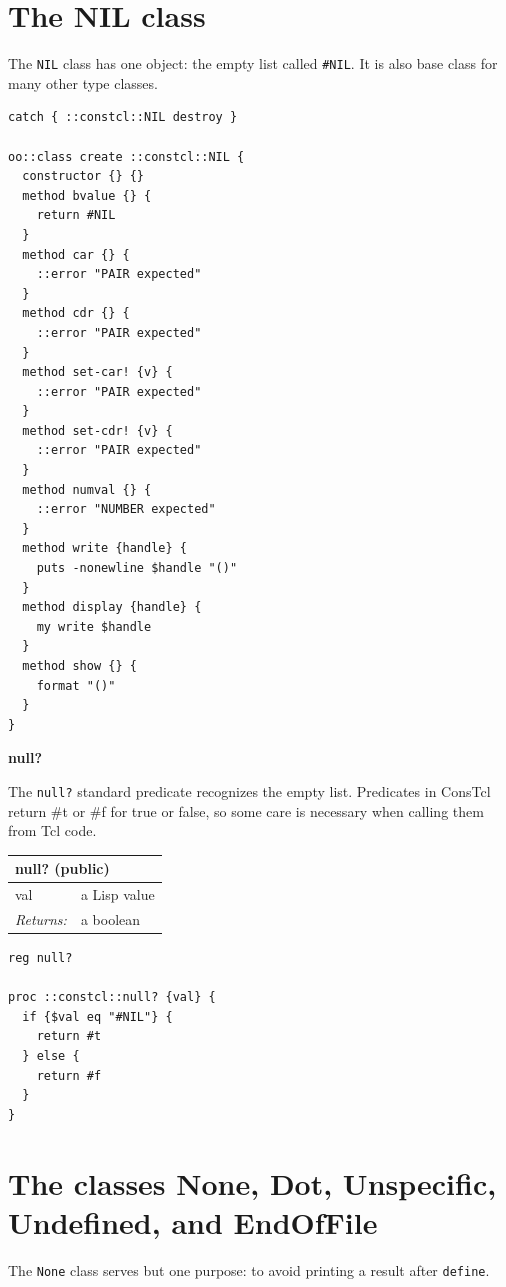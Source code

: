 \documentclass[twoside,9pt]{report}
\begin{document}
\section{The NIL class}
\label{the-nil-class}

The \texttt{NIL} class has one object: the empty list called \texttt{\#NIL}. It is also base class for many other type classes.

\noindent\makebox[\linewidth]{\rule{\linewidth}{0.4pt}}
\begin{lstlisting}
catch { ::constcl::NIL destroy }
 
oo::class create ::constcl::NIL {
  constructor {} {}
  method bvalue {} {
    return #NIL
  }
  method car {} {
    ::error "PAIR expected"
  }
  method cdr {} {
    ::error "PAIR expected"
  }
  method set-car! {v} {
    ::error "PAIR expected"
  }
  method set-cdr! {v} {
    ::error "PAIR expected"
  }
  method numval {} {
    ::error "NUMBER expected"
  }
  method write {handle} {
    puts -nonewline $handle "()"
  }
  method display {handle} {
    my write $handle
  }
  method show {} {
    format "()"
  }
}
\end{lstlisting}
\noindent\makebox[\linewidth]{\rule{\linewidth}{0.4pt}}

\textbf{null?}


The \texttt{null?} standard predicate recognizes the empty list. Predicates in ConsTcl return \#t or \#f for true or false, so some care is necessary when calling them from Tcl code.

\begin{tabular}{ |l l| }
\hline
\multicolumn{2}{|l|}{null? (public)} \\
\hline
val & a Lisp value \\
\textit{Returns:} & a boolean \\
\hline
\end{tabular}

\noindent\makebox[\linewidth]{\rule{\linewidth}{0.4pt}}
\begin{lstlisting}
reg null?
 
proc ::constcl::null? {val} {
  if {$val eq "#NIL"} {
    return #t
  } else {
    return #f
  }
}
\end{lstlisting}
\noindent\makebox[\linewidth]{\rule{\linewidth}{0.4pt}}
\section{The classes None, Dot, Unspecific, Undefined, and EndOfFile}
\label{the-classes-none,-dot,-unspecific,-undefined,-and-endoffile}

The \texttt{None} class serves but one purpose: to avoid printing a result after \texttt{define}.
\end{document}
